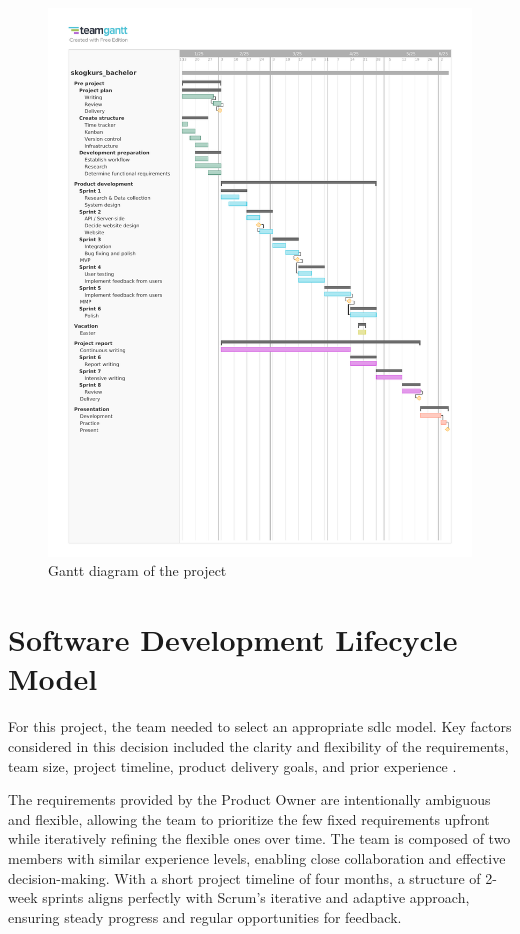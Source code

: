 \begin{figure}[h]
    \centering
        \includegraphics[width=1.0\linewidth, trim=0 60mm 0 20mm, clip]{figures/skogkurs_bachelor_gantt.pdf}
    \caption{Gantt diagram of the project}
    \label{fig:gantt_diagram}
\end{figure}

\section{Software Development Lifecycle Model}

For this project, the team needed to select an appropriate \acrfull{sdlc} model. Key factors considered in this decision included the clarity and flexibility of the requirements, team size, project timeline, product delivery goals, and prior experience \cite{sdlc_model}. 

The requirements provided by the Product Owner are intentionally ambiguous and flexible, allowing the team to prioritize the few fixed requirements upfront while iteratively refining the flexible ones over time. The team is composed of two members with similar experience levels, enabling close collaboration and effective decision-making. With a short project timeline of four months, a structure of 2-week sprints aligns perfectly with Scrum's iterative and adaptive approach, ensuring steady progress and regular opportunities for feedback. 

